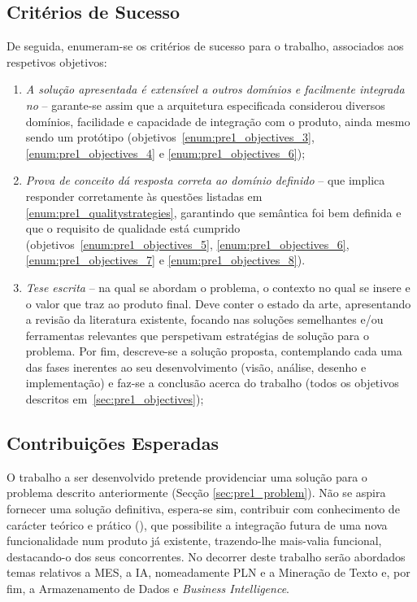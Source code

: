 \subsection{Critérios de Sucesso}

De seguida, enumeram-se os critérios de sucesso para o trabalho, associados aos respetivos objetivos:

\begin{enumerate}
    \item
    {
        \textit{A solução apresentada é extensível a outros domínios e facilmente integrada no {\productname}} -- garante-se assim que a arquitetura especificada considerou diversos domínios, facilidade e capacidade de integração com o produto, ainda mesmo sendo um protótipo (objetivos~\ref{enum:pre1_objectives_3}, \ref{enum:pre1_objectives_4} e \ref{enum:pre1_objectives_6});
    }
    \item
    {
        \textit{Prova de conceito dá resposta correta ao domínio definido} -- que implica responder corretamente às questões listadas em \ref{enum:pre1_qualitystrategies}, garantindo que semântica foi bem definida e que o requisito de qualidade está cumprido (objetivos~\ref{enum:pre1_objectives_5}, \ref{enum:pre1_objectives_6}, \ref{enum:pre1_objectives_7} e \ref{enum:pre1_objectives_8}).
    }
    \item 
    {
        \textit{Tese escrita} -- na qual se abordam o problema, o contexto no qual se insere e o valor que traz ao produto final. Deve conter o estado da arte, apresentando a revisão da literatura existente, focando nas soluções semelhantes e/ou ferramentas relevantes que perspetivam estratégias de solução para o problema. Por fim, descreve-se a solução proposta, contemplando cada uma das fases inerentes ao seu desenvolvimento (visão, análise, desenho e implementação) e faz-se a conclusão acerca do trabalho (todos os objetivos descritos em~\ref{sec:pre1_objectives});
    }
\end{enumerate}

\subsection{Contribuições Esperadas}

O trabalho a ser desenvolvido pretende providenciar uma solução para o problema descrito anteriormente (Secção \ref{sec:pre1_problem}). Não se aspira fornecer uma solução definitiva, espera-se sim, contribuir com conhecimento de carácter teórico e prático (), que possibilite a integração futura de uma nova funcionalidade num produto já existente, trazendo-lhe mais-valia funcional, destacando-o dos seus concorrentes. No decorrer deste trabalho serão abordados temas relativos a \gls{MES}, a \gls{IA}, nomeadamente \gls{PLN} e a Mineração de Texto e, por fim, a Armazenamento de Dados e \textit{Business Intelligence}. 

